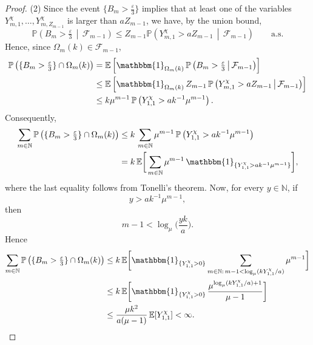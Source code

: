 \documentclass[10pt,a4paper]{amsart}
\newcommand{\EE}{\mathbb E}
\newcommand{\N}{\mathbb N}
\newcommand{\PP}{\mathbb{P}}
\begin{document}
\begin{proof}
\medskip\noindent
(2) Since the event $\{B_m>\tfrac{\varepsilon}{3}\}$ implies that at least one of the variables $Y_{m,1}^{\chi},\ldots,Y_{m,Z_{m-1}}^{\chi}$ is larger than $aZ_{m-1}$, we have, by the union bound,
\[
\PP\left( B_m>\tfrac{\varepsilon}{3} \,\middle|\, \mathcal{F}_{m-1}\right)
\leq Z_{m-1}\PP\left( Y_{m,1}^{\chi}>aZ_{m-1} \,\middle|\, \mathcal{F}_{m-1}\right)  \qquad \mathrm{a.s.}
\]
Hence, since $\Omega_m(k)\in\mathcal F_{m-1}$,
\[
\begin{aligned}
\PP\left(\{B_m>\tfrac{\varepsilon}{3}\}\cap\Omega_m(k)\right)
&
= \EE\left[ \mathbbm{1}_{\Omega_m(k)}\,\PP\left( B_m>\tfrac{\varepsilon}{3} \,\middle|\, \mathcal{F}_{m-1} \right) \right]
\\&
\leq \EE\left[ \mathbbm{1}_{\Omega_m(k)}\, Z_{m-1}\, \PP\left( Y_{m,1}^{\chi} > aZ_{m-1} \,\middle|\, \mathcal{F}_{m-1} \right) \right]
\\&
\leq k\mu^{m-1}\,\PP\left( Y_{1,1}^{\chi} > ak^{-1}\mu^{m-1} \right).
\end{aligned}
\]
Consequently,
\[
\begin{aligned}
\sum_{m\in\N} \PP\left( \{B_m>\tfrac{\varepsilon}{3}\}\cap\Omega_m(k) \right)
&
\leq k\, \sum_{m\in\N} \mu^{m-1}\, \PP\left( Y_{1,1}^{\chi} > ak^{-1}\mu^{m-1} \right)
\\&
= k\, \EE\bigg[ \sum_{m\in\N} \mu^{m-1}\, \mathbbm{1}_{\{Y_{1,1}^{\chi}>ak^{-1}\mu^{m-1}\}} \bigg],
\end{aligned}
\]
where the last equality follows from Tonelli's theorem. 
Now, for every $y\in\N$, if
\[
y > ak^{-1}\mu^{m-1},
\]
then
\[
m-1< \log_\mu\Big(\frac{yk}{a}\Big).
\]
Hence
\[
\begin{aligned}
\sum_{m\in\N}\PP\left(\{B_m>\tfrac{\varepsilon}{3}\}\cap\Omega_m(k)\right)
&
\leq
k\, \EE\bigg[\mathbbm{1}_{\{Y_{1,1}^{\chi}>0\}}\sum_{m\in\N:\, m-1<\log_{\mu}(kY_{1,1}^{\chi}/a)} \mu^{m-1} \bigg]
\\&
\leq k\, \EE\bigg[\mathbbm{1}_{\{Y_{1,1}^{\chi}>0\}}\, \frac{\mu^{\log_{\mu}(kY_{1,1}^{\chi}/a)+1}}{\mu-1}\bigg]
\\&
\leq \frac{\mu k^2}{a(\mu-1)}\,\EE[Y_{1,1}^{\chi}] < \infty.
\end{aligned}
\]
 

\end{proof}
\end{document}
